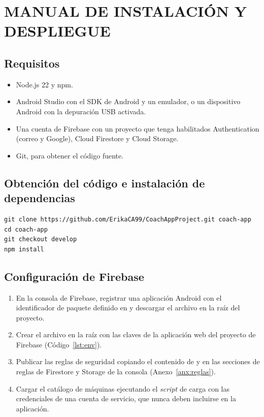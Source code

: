 \chapter{MANUAL DE INSTALACIÓN Y DESPLIEGUE}
\label{anx:instalacion}

\section{Requisitos}

\begin{itemize}
    \item Node.js 22 y npm.
    \item Android Studio con el SDK de Android y un emulador, o un dispositivo
    Android con la depuración USB activada.
    \item Una cuenta de Firebase con un proyecto que tenga habilitados
    Authentication (correo y Google), Cloud Firestore y Cloud Storage.
    \item Git, para obtener el código fuente.
\end{itemize}

\section{Obtención del código e instalación de dependencias}

\begin{lstlisting}[language={}, numbers=none, caption={Instalación del proyecto}, label={lst:instalacion}]
git clone https://github.com/ErikaCA99/CoachAppProject.git coach-app
cd coach-app
git checkout develop
npm install
\end{lstlisting}

\section{Configuración de Firebase}

\begin{enumerate}
    \item En la consola de Firebase, registrar una aplicación Android con el
    identificador de paquete definido en  y descargar el
    archivo  en la raíz del proyecto.
    \item Crear el archivo  en la raíz con las claves de la
    aplicación web del proyecto de Firebase (Código~\ref{lst:env}).
    \item Publicar las reglas de seguridad copiando el contenido de
     y  en las secciones de
    reglas de Firestore y Storage de la consola (Anexo~\ref{anx:reglas}).
    \item Cargar el catálogo de máquinas ejecutando el \emph{script} de carga
    con las credenciales de una cuenta de servicio, que nunca deben incluirse
    en la aplicación.
\end{enumerate}

